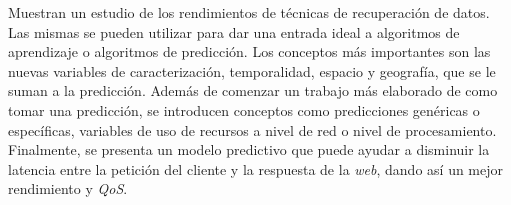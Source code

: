   Muestran un estudio de los rendimientos de técnicas de recuperación de datos.
  Las mismas se pueden utilizar para dar una entrada ideal a algoritmos de aprendizaje o algoritmos de predicción. 
  Los conceptos más importantes son las nuevas variables de caracterización, temporalidad, espacio y geografía, que se le suman a la predicción. 
  Además de comenzar un trabajo más elaborado de como tomar una predicción, se introducen conceptos como predicciones genéricas o específicas, variables de uso de recursos a nivel de red o nivel de procesamiento.
  Finalmente, se presenta un modelo predictivo que puede ayudar a disminuir la latencia entre la petición del cliente y la respuesta de la \emph{web}, dando así un mejor rendimiento y \emph{QoS}.
  

